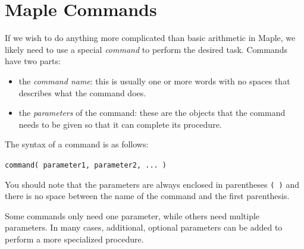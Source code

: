 \begin{maplegroup}
\begin{mapleinput}
\end{mapleinput}
\mapleresult
\begin{maplelatex}
\end{maplelatex}
\end{maplegroup}

\begin{maplegroup}
\begin{mapleinput}
\end{mapleinput}
\mapleresult
\begin{maplelatex}
\end{maplelatex}
\end{maplegroup}

\section{Maple Commands}

If we wish to do anything more complicated than basic arithmetic in Maple, we likely need to use a special \textit{command} to perform the desired task. Commands have two parts:
\begin{itemize}
\item the \textit{command name}: this is usually one or more words with no spaces that describes what the command does.
\item the \textit{parameters} of the command: these are the objects that the command needs to be given so that it can complete its procedure.
\end{itemize}
The syntax of a command is as follows:
\begin{center}
\texttt{command( parameter1, parameter2, ... )}
\end{center}
You should note that the parameters are always enclosed in parentheses \texttt{( )} and there is no space between the name of the command and the first parenthesis. 

Some commands only need one parameter, while others need multiple parameters. In many cases, additional, optional parameters can be added to perform a more specialized procedure.


